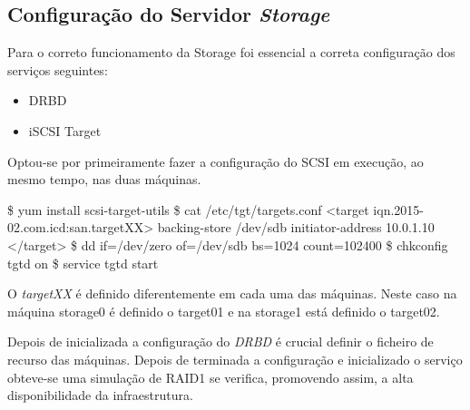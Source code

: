 \subsection{Configuração do Servidor \textit{Storage}}

Para o correto funcionamento da Storage foi essencial a correta configuração dos serviços seguintes:

\begin{itemize}
  \item DRBD
  \item iSCSI Target
\end{itemize}

Optou-se por primeiramente fazer a configuração do SCSI em execução, ao mesmo tempo, nas duas máquinas.

\begin{MyVerbatims}
  \$ yum install scsi-target-utils
  \$ cat /etc/tgt/targets.conf
    <target iqn.2015-02.com.icd:san.targetXX>
      backing-store /dev/sdb
      initiator-address 10.0.1.10
    </target>
  \$ dd if=/dev/zero of=/dev/sdb bs=1024 count=102400
  \$ chkconfig tgtd on
  \$ service tgtd start
\end{MyVerbatims}

O \textit{targetXX} é definido diferentemente em cada uma das máquinas. Neste caso na máquina storage0 é definido o target01 e na storage1 está definido o target02.

Depois de inicializada a configuração do \textit{DRBD} é crucial definir o ficheiro de recurso das máquinas. Depois de terminada a configuração e inicializado o serviço obteve-se uma simulação de RAID1 se verifica, promovendo assim, a alta disponibilidade da infraestrutura.
